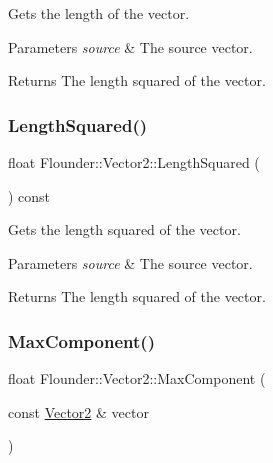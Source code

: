 Gets the length of the vector. 


\begin{DoxyParams}{Parameters}
{\em source} & The source vector. \\
\hline
\end{DoxyParams}
\begin{DoxyReturn}{Returns}
The length squared of the vector. 
\end{DoxyReturn}
\mbox{\label{class_flounder_1_1_vector2_aa49723db7c24d370125838035cc15507}} 
\subsubsection{\texorpdfstring{Length\+Squared()}{LengthSquared()}\hspace{0.1cm}{\footnotesize\ttfamily [2/2]}}
{\footnotesize\ttfamily float Flounder\+::\+Vector2\+::\+Length\+Squared (\begin{DoxyParamCaption}{ }\end{DoxyParamCaption}) const}



Gets the length squared of the vector. 


\begin{DoxyParams}{Parameters}
{\em source} & The source vector. \\
\hline
\end{DoxyParams}
\begin{DoxyReturn}{Returns}
The length squared of the vector. 
\end{DoxyReturn}
\mbox{\label{class_flounder_1_1_vector2_a10a9c4f921f9ddddd25e1bbe30f35555}} 
\subsubsection{\texorpdfstring{Max\+Component()}{MaxComponent()}}
{\footnotesize\ttfamily float Flounder\+::\+Vector2\+::\+Max\+Component (\begin{DoxyParamCaption}\item[{const \hyperlink{class_flounder_1_1_vector2}{Vector2} \&}]{vector }\end{DoxyParamCaption})\hspace{0.3cm}{\ttfamily [static]}}




